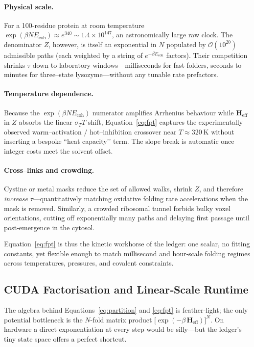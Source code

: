 \documentclass[11pt]{article}
\newcommand{\Eoh}{E_{\mathrm{coh}}}          %
\begin{document}
\paragraph{Physical scale.}
For a 100‐residue protein at room temperature
$\exp(\beta N\Eoh)\approx e^{340}\sim1.4\times10^{147}$, an astronomically
large raw clock.  The denominator $Z$, however, is itself an exponential
in $N$ populated by $\mathcal O(10^{20})$ admissible paths (each
weighted by a string of $e^{-\beta \Eoh}$ factors).  Their competition
shrinks $\tau$ down to laboratory windows—milliseconds for fast folders,
seconds to minutes for three–state lysozyme—without any tunable rate
prefactors.

\paragraph{Temperature dependence.}
Because the $\exp(\beta N\Eoh)$ numerator amplifies Arrhenius behaviour
while $\mathbf H_{\text{eff}}$ in $Z$ absorbs the linear
$\sigma_{T}T$ shift, Equation~\eqref{eq:fpt} captures the experimentally
observed warm–activation / hot–inhibition crossover near $T\!\approx\!
320$ K without inserting a bespoke “heat capacity’’ term.  The slope
break is automatic once integer costs meet the solvent offset.

\paragraph{Cross–links and crowding.}
Cystine or metal masks reduce the set of allowed walks, shrink $Z$, and
therefore \emph{increase} $\tau$—quantitatively matching oxidative
folding rate accelerations when the mask is removed.  Similarly, a
crowded ribosomal tunnel forbids bulky voxel orientations, cutting off
exponentially many paths and delaying first passage until post‐emergence
in the cytosol.

Equation~\eqref{eq:fpt} is thus the kinetic workhorse of the ledger:
one scalar, no fitting constants, yet flexible enough to match
millisecond and hour‐scale folding regimes across temperatures,
pressures, and covalent constraints.

\subsection{CUDA Factorisation and Linear‐Scale Runtime}
\label{sec:cuda}

The algebra behind Equations~\eqref{eq:partition} and
\eqref{eq:fpt} is feather-light; the only potential bottleneck is the
$N$-fold matrix product
$\bigl[\exp(-\beta\,\mathbf H_{\text{eff}})\bigr]^{N}$.  On hardware a
direct exponentiation at every step would be silly—but the ledger’s tiny
state space offers a perfect shortcut.
\end{document}
